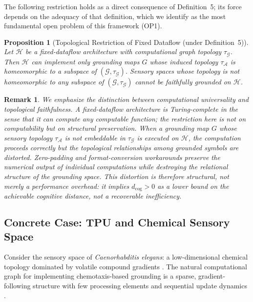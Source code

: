 \documentclass[12pt]{article}
\newtheorem{proposition}{Proposition}
\newtheorem{remark}{Remark}
\begin{document}
The following restriction holds as a direct consequence of
Definition~5; its force depends on the adequacy of that definition,
which we identify as the most fundamental open problem of this
framework (OP1).

\begin{proposition}[Topological Restriction of Fixed Dataflow
  (under Definition~5)]
Let $\mathcal{H}$ be a fixed-dataflow architecture with computational
graph topology $\tau_{\mathcal{G}}$. Then $\mathcal{H}$ can implement
only grounding maps $G$ whose induced topology $\tau_{\mathcal{A}}$ is
homeomorphic to a subspace of $(\mathcal{G}, \tau_{\mathcal{G}})$.
Sensory spaces whose topology is not homeomorphic to any subspace of
$(\mathcal{G}, \tau_{\mathcal{G}})$ cannot be faithfully grounded on
$\mathcal{H}$.
\end{proposition}

\begin{remark}
We emphasize the distinction between \emph{computational universality}
and \emph{topological faithfulness}. A fixed-dataflow architecture is
Turing-complete in the sense that it can compute any computable
function; the restriction here is not on computability but on structural
preservation. When a grounding map $G$ whose sensory topology
$\tau_{\mathcal{A}}$ is not embeddable in $\tau_{\mathcal{G}}$ is
executed on $\mathcal{H}$, the computation proceeds correctly but the
topological relationships among grounded symbols are distorted.
Zero-padding and format-conversion workarounds preserve the numerical
output of individual computations while destroying the relational
structure of the grounding space. This distortion is therefore
structural, not merely a performance overhead: it implies
$d_{\mathrm{cog}} > 0$ as a \emph{lower bound} on the achievable
cognitive distance, not a recoverable inefficiency.
\end{remark}

\subsection{Concrete Case: TPU and Chemical Sensory Space}

Consider the sensory space of \textit{Caenorhabditis elegans}: a
low-dimensional chemical topology dominated by volatile compound gradients
\cite{bargmann2006}. The natural computational graph for implementing
chemotaxis-based grounding is a sparse, gradient-following structure with
few processing elements and sequential update dynamics \cite{white1986}.
\end{document}
